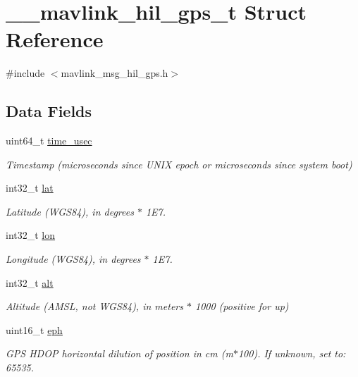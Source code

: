 \hypertarget{struct____mavlink__hil__gps__t}{\section{\+\_\+\+\_\+mavlink\+\_\+hil\+\_\+gps\+\_\+t Struct Reference}
\label{struct____mavlink__hil__gps__t}
}


{\ttfamily \#include $<$mavlink\+\_\+msg\+\_\+hil\+\_\+gps.\+h$>$}

\subsection*{Data Fields}
\begin{DoxyCompactItemize}
\item 
uint64\+\_\+t \hyperlink{struct____mavlink__hil__gps__t_a06069c8971366092665b51a939e9abb3}{time\+\_\+usec}
\begin{DoxyCompactList}\small\item\em Timestamp (microseconds since U\+N\+I\+X epoch or microseconds since system boot) \end{DoxyCompactList}\item 
int32\+\_\+t \hyperlink{struct____mavlink__hil__gps__t_a5adc957f66ccbd23fe9bfabd056c03c5}{lat}
\begin{DoxyCompactList}\small\item\em Latitude (W\+G\+S84), in degrees $\ast$ 1\+E7. \end{DoxyCompactList}\item 
int32\+\_\+t \hyperlink{struct____mavlink__hil__gps__t_abfec6d143d48f5b7e5e37cd8c98d6f82}{lon}
\begin{DoxyCompactList}\small\item\em Longitude (W\+G\+S84), in degrees $\ast$ 1\+E7. \end{DoxyCompactList}\item 
int32\+\_\+t \hyperlink{struct____mavlink__hil__gps__t_a9d9f5ccc1ded23c02b7a7ed760c66a73}{alt}
\begin{DoxyCompactList}\small\item\em Altitude (A\+M\+S\+L, not W\+G\+S84), in meters $\ast$ 1000 (positive for up) \end{DoxyCompactList}\item 
uint16\+\_\+t \hyperlink{struct____mavlink__hil__gps__t_a1886825c99c4312c1c5f5e2e42c8ebc2}{eph}
\begin{DoxyCompactList}\small\item\em G\+P\+S H\+D\+O\+P horizontal dilution of position in cm (m$\ast$100). If unknown, set to\+: 65535. \end{DoxyCompactList}\item 

\end{DoxyCompactItemize}
